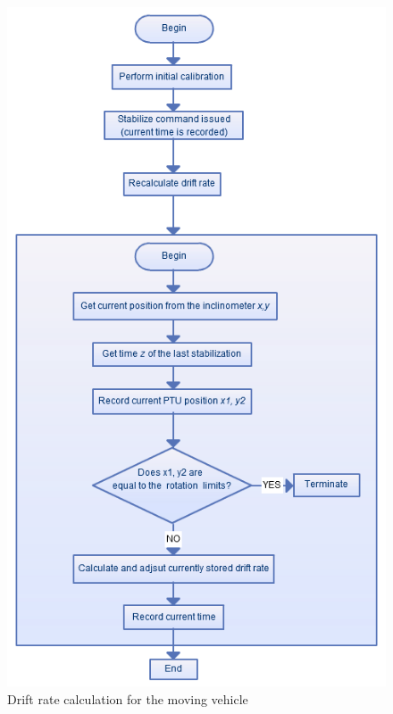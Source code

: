 \begin{figure}[H]
\centering
\centerline{\includegraphics[scale=0.70]{./images/DriftRateInclinometer}}
\caption{Drift rate calculation for the moving vehicle}
\label{fig:DriftRateInclinometer}
\end{figure}

 